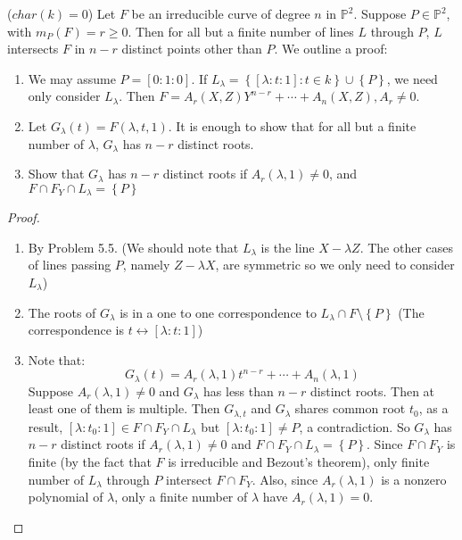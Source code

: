 \documentclass{solution}
\begin{document}
\begin{problem}{5.26}
    ($char(k) = 0$) Let $F$ be an irreducible curve of degree $n$ in $\mathbb{P}^2$. Suppose $P \in \mathbb{P}^2$, with $m_P(F) = r \ge 0$. Then for all but a finite number of lines $L$ through $P$, $L$ intersects $F$ in $n - r$ distinct points other than $P$. We outline a proof:
    \begin{enumerate}
        \item We may assume $P = [0:1:0]$. If $L_{\lambda} = \left\lbrace [\lambda:t:1]: t \in k \right\rbrace \cup \left\lbrace P \right\rbrace$, we need only consider $L_\lambda$. Then $F = A_r(X, Z)Y^{n - r} + \cdots + A_n(X, Z), A_r \ne 0$.
        \item Let $G_\lambda(t) = F(\lambda, t, 1)$. It is enough to show that for all but a finite number of $\lambda$, $G_\lambda$ has $n - r$ distinct roots.
        \item Show that $G_\lambda$ has $n - r$ distinct roots if $A_r(\lambda, 1) \ne 0$, and $F \cap F_Y \cap L_\lambda = \left\lbrace P \right\rbrace$
    \end{enumerate}
\end{problem}

\begin{proof}
    \begin{enumerate}
        \item By Problem 5.5. (We should note that $L_{\lambda}$ is the line $X - \lambda Z$. The other cases of lines passing $P$, namely $Z - \lambda X$, are symmetric so we only need to consider $L_{\lambda}$)
        \item The roots of $G_\lambda$ is in a one to one correspondence to $L_\lambda \cap F \setminus \left\lbrace P \right\rbrace$ (The correspondence is $t \leftrightarrow [\lambda:t:1]$)
        \item Note that:
        $$G_{\lambda}(t) = A_{r}(\lambda, 1)t^{n - r} + \cdots + A_n(\lambda, 1)$$
        Suppose $A_r(\lambda, 1) \ne 0$ and $G_\lambda$ has less than $n - r$ distinct roots. Then at least one of them is multiple. Then $G_{\lambda, t}$ and $G_\lambda$ shares common root $t_0$, as a result, $[\lambda:t_0:1] \in F \cap F_Y \cap L_{\lambda}$ but $[\lambda:t_0:1] \ne P$, a contradiction. So $G_\lambda$ has $n - r$ distinct roots if $A_{r}(\lambda, 1) \ne 0$ and $F \cap F_Y \cap L_{\lambda} = \left\lbrace P \right\rbrace$. Since $F \cap F_Y$ is finite (by the fact that $F$ is irreducible and Bezout's theorem), only finite number of $L_{\lambda}$ through $P$ intersect $F \cap F_{Y}$. Also, since $A_r(\lambda, 1)$ is a nonzero polynomial of $\lambda$, only a finite number of $\lambda$ have $A_{r}(\lambda, 1) = 0$.
    \end{enumerate}
\end{proof}
\end{document}
